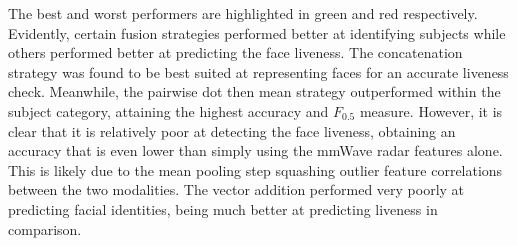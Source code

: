 \documentclass{mpaper}
\begin{document}
\begin{table}[htbp]
    \centering
    \vspace{0.1cm}
    \caption{Subject and liveness accuracies and weighted-averaged $F_{0.5}$ measures for the seven feature fusion strategies along with the individual modalities.}
    \label{tab:subject_liveness_acc_fb}
    \vspace{-0.1cm}
\end{table}

The best and worst performers are highlighted in green and red respectively. Evidently, certain fusion strategies performed better at identifying subjects while others performed better at predicting the face liveness. The concatenation strategy was found to be best suited at representing faces for an accurate liveness check. Meanwhile, the pairwise dot then mean strategy outperformed within the subject category, attaining the highest accuracy and $F_{0.5}$ measure. However, it is clear that it is relatively poor at detecting the face liveness, obtaining an accuracy that is even lower than simply using the mmWave radar features alone. This is likely due to the mean pooling step squashing outlier feature correlations between the two modalities. The vector addition performed very poorly at predicting facial identities, being much better at predicting liveness in comparison. 
\end{document}
